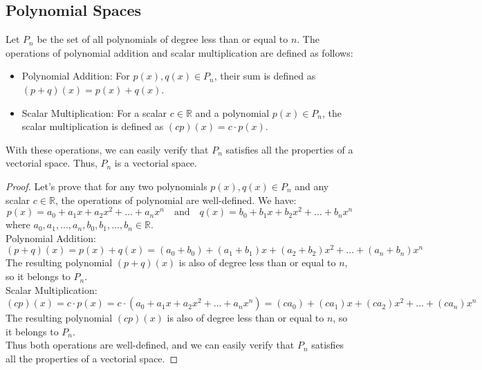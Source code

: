 \subsection{Polynomial Spaces}
\begin{definition}
    Let $P_n$ be the set of all polynomials of degree less than or equal to $n$. The operations of polynomial addition and scalar multiplication are defined as follows:
    \begin{itemize}[itemsep=1pt,label=$\circ$]
        \item Polynomial Addition: For $p(x), q(x) \in P_n$, their sum is defined as $(p + q)(x) = p(x) + q(x)$.
        \item Scalar Multiplication: For a scalar $c \in \mathbb{R}$ and a polynomial $p(x) \in P_n$, the scalar multiplication is defined as $(cp)(x) = c \cdot p(x)$.
    \end{itemize}
    With these operations, we can easily verify that $P_n$ satisfies all the properties of a vectorial space. Thus, $P_n$ is a vectorial space.
\end{definition}
\begin{proof}
    Let's prove that for any two polynomials $p(x), q(x) \in P_n$ and any scalar $c \in \mathbb{R}$, the operations of polynomial are well-defined. We have:
    \[
        p(x) = a_0 + a_1 x + a_2 x^2 + ... + a_n x^n \quad \text{and} \quad q(x) = b_0 + b_1 x + b_2 x^2 + ... + b_n x^n
    \]
    where $a_0, a_1, ..., a_n, b_0, b_1, ..., b_n \in \mathbb{R}$. \\
    Polynomial Addition:
    \[(p + q)(x) = p(x) + q(x) = (a_0 + b_0) + (a_1 + b_1)x + (a_2 + b_2)x^2 + ... + (a_n + b_n)x^n\]
    The resulting polynomial $(p + q)(x)$ is also of degree less than or equal to $n$, so it belongs to $P_n$. \\
    Scalar Multiplication:
    \[(cp)(x) = c \cdot p(x) = c \cdot (a_0 + a_1 x + a_2 x^2 + ... + a_n x^n) = (c a_0) + (c a_1)x + (c a_2)x^2 + ... + (c a_n)x^n\]
    The resulting polynomial $(cp)(x)$ is also of degree less than or equal to $n$, so it belongs to $P_n$. \\
    Thus both operations are well-defined, and we can easily verify that $P_n$ satisfies all the properties of a vectorial space.
\end{proof}

